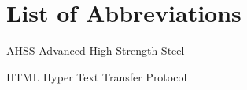 
\chapter*{List of Abbreviations}

\begin{abbrv}
	
	\item[AHSS]			Advanced High Strength Steel
	\item[HTML]			Hyper Text Transfer Protocol
	
\end{abbrv}